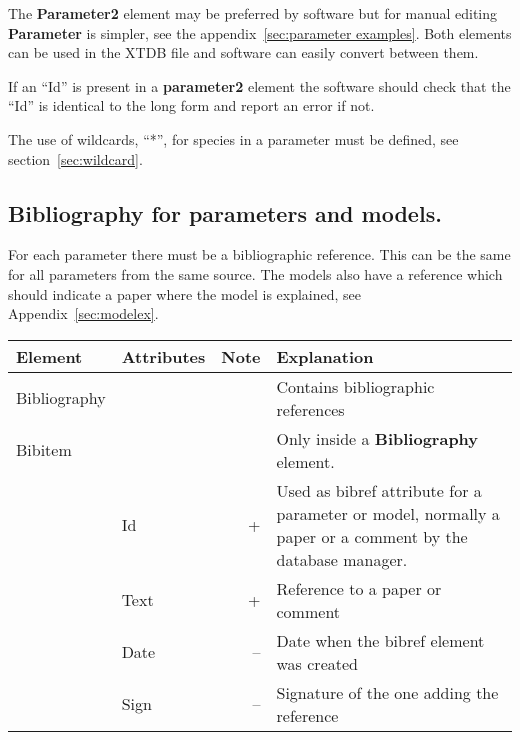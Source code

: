 \documentclass{article}
\begin{document}
\bigskip
The {\bf Parameter2} element may be preferred by software but for
manual editing {\bf Parameter} is simpler, see the
appendix~\ref{sec:parameter examples}.  Both elements can be used in
the XTDB file and software can easily convert between them.

If an ``Id'' is present in a {\bf parameter2} element the software
should check that the ``Id'' is identical to the long form and report
an error if not.

The use of wildcards, ``*'', for species in a parameter must be
defined, see section~\ref{sec:wildcard}.



\newpage 

\subsection{Bibliography for parameters and models.}\label{sec:biblio}

For each parameter there must be a bibliographic reference.  This can
be the same for all parameters from the same source.  The models also
have a reference which should indicate a paper where the model is
explained, see Appendix~\ref{sec:modelex}.

\bigskip
\begin{tabular}{|p{} p{} r p{}|}\hline
  Element & Attributes & Note & Explanation\\\hline

  Bibliography & && Contains bibliographic references\\\hline

  Bibitem & && Only inside a {\bf Bibliography} element.\\
      & Id & + &   Used as bibref attribute for a parameter or model, normally a paper or a comment by the database manager.\\
      & Text & + & Reference to a paper or comment\\
      & Date & -- & Date when the bibref element was created\\
      & Sign & -- & Signature of the one adding the reference\\\hline

\end{tabular}


\newpage 
\end{document}

